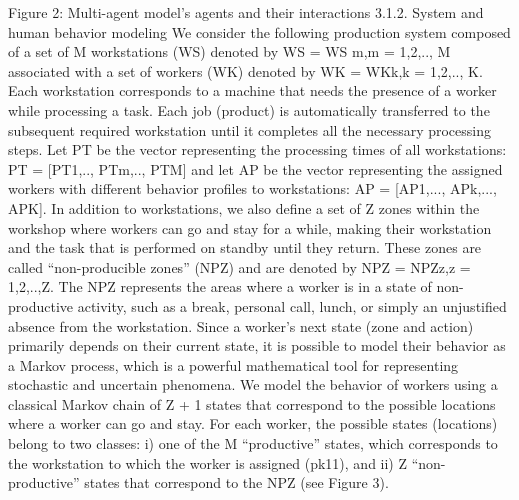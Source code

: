 Figure 2: Multi-agent model’s agents and their interactions
3.1.2.	System and human behavior modeling
We consider the following production system composed of a set of M workstations (WS) denoted by WS = {WS m,m = 1,2,.., M} associated with a set of workers (WK) denoted by WK = {WKk,k = 1,2,.., K}. Each workstation corresponds to a machine that needs the presence of a worker while processing a task. Each job (product) is automatically transferred to the subsequent required workstation until it completes all the necessary processing steps. Let PT be the vector representing the processing times of all workstations: PT = [PT1,.., PTm,.., PTM] and let AP be the vector representing the assigned workers with different behavior profiles to workstations: AP = [AP1,..., APk,..., APK]. In addition to workstations, we also define a set of Z zones within the workshop where workers can go and stay for a while, making their workstation and the task that is performed on standby until they return. These zones are called “non-producible zones” (NPZ) and are denoted by NPZ = {NPZz,z = 1,2,..,Z}. The NPZ represents the areas where a worker is in a state of non-productive activity, such as a break, personal call, lunch, or simply an unjustified absence from the workstation.
Since a worker’s next state (zone and action) primarily depends on their current state, it is possible to model their behavior as a Markov process, which is a powerful mathematical tool for representing stochastic and uncertain phenomena. We model the behavior of workers using a classical Markov chain of Z + 1 states that correspond to the possible locations where a worker can go and stay. For each worker, the possible states (locations) belong to two classes: i) one of the M “productive” states, which corresponds to the workstation to which the worker is assigned (pk11), and ii) Z “non-productive” states that correspond to the NPZ (see Figure 3).
 
